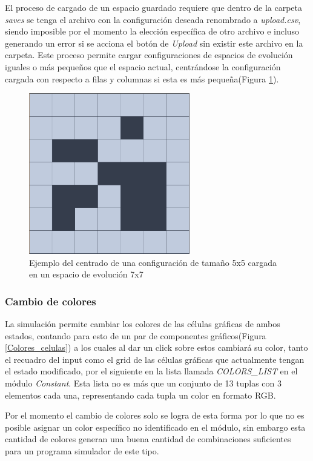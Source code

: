 \documentclass[]{article}
\begin{document}
			El proceso de cargado de un espacio guardado requiere que dentro de la carpeta \textit{saves} se tenga el archivo con la configuración deseada renombrado a \textit{upload.csv}, siendo imposible por el momento la elección específica de otro archivo e incluso generando un error si se acciona el botón de \textit{Upload} sin existir este archivo en la carpeta. Este proceso permite cargar configuraciones de espacios de evolución iguales o más pequeños que el espacio actual, centrándose la configuración cargada con respecto a filas y columnas si esta es más pequeña(Figura \ref{Centrado_configuracion_cargada}).
			
			\begin{figure}[!h]
				\centering
				\includegraphics[width=7cm]{Imagenes/Ejemplo_configuracion_cargada.png}
				\caption{Ejemplo del centrado de una configuración de tamaño 5x5 cargada en un espacio de evolución 7x7}
				\label{Centrado_configuracion_cargada}
			\end{figure}
		
		\subsubsection{Cambio de colores}
			La simulación permite cambiar los colores de las células gráficas de ambos estados, contando para esto de un par de componentes gráficos(Figura \ref{Colores_celulas}) a los cuales al dar un click sobre estos cambiará su color, tanto el recuadro del input como el grid de las células gráficas que actualmente tengan el estado modificado, por el siguiente en la lista llamada \textit{COLORS\_LIST} en el módulo \textit{Constant}. Esta lista no es más que un conjunto de 13 tuplas con 3 elementos cada una, representando cada tupla un color en formato RGB.
			
			Por el momento el cambio de colores solo se logra de esta forma por lo que no es posible asignar un color específico no identificado en el módulo, sin embargo esta cantidad de colores generan una buena cantidad de combinaciones suficientes para un programa simulador de este tipo.
\end{document}
